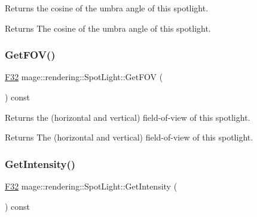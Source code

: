 Returns the cosine of the umbra angle of this spotlight.

\begin{DoxyReturn}{Returns}
The cosine of the umbra angle of this spotlight. 
\end{DoxyReturn}
\mbox{\label{classmage_1_1rendering_1_1_spot_light_a22527d940bc7601285429b36e8d97490}} 
\subsubsection{\texorpdfstring{Get\+F\+O\+V()}{GetFOV()}}
{\footnotesize\ttfamily \mbox{\hyperlink{namespacemage_aa97e833b45f06d60a0a9c4fc22ae02c0}{F32}} mage\+::rendering\+::\+Spot\+Light\+::\+Get\+F\+OV (\begin{DoxyParamCaption}{ }\end{DoxyParamCaption}) const\hspace{0.3cm}{\ttfamily [noexcept]}}

Returns the (horizontal and vertical) field-\/of-\/view of this spotlight.

\begin{DoxyReturn}{Returns}
The (horizontal and vertical) field-\/of-\/view of this spotlight. 
\end{DoxyReturn}
\mbox{\label{classmage_1_1rendering_1_1_spot_light_ac3fe64c6d599149cf569693f74ac41e8}} 
\subsubsection{\texorpdfstring{Get\+Intensity()}{GetIntensity()}}
{\footnotesize\ttfamily \mbox{\hyperlink{namespacemage_aa97e833b45f06d60a0a9c4fc22ae02c0}{F32}} mage\+::rendering\+::\+Spot\+Light\+::\+Get\+Intensity (\begin{DoxyParamCaption}{ }\end{DoxyParamCaption}) const\hspace{0.3cm}{\ttfamily [noexcept]}}

